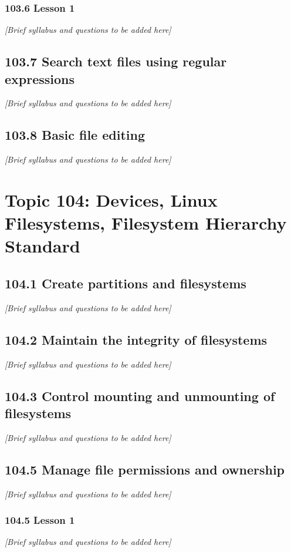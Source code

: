 \documentclass[12pt,a4paper]{report}
\begin{document}
\subsection*{103.6 Lesson 1}
\textit{[Brief syllabus and questions to be added here]}

\section{103.7 Search text files using regular expressions}
\textit{[Brief syllabus and questions to be added here]}

\section{103.8 Basic file editing}
\textit{[Brief syllabus and questions to be added here]}

\chapter{Topic 104: Devices, Linux Filesystems, Filesystem Hierarchy Standard}

\section{104.1 Create partitions and filesystems}
\textit{[Brief syllabus and questions to be added here]}

\section{104.2 Maintain the integrity of filesystems}
\textit{[Brief syllabus and questions to be added here]}

\section{104.3 Control mounting and unmounting of filesystems}
\textit{[Brief syllabus and questions to be added here]}

\section{104.5 Manage file permissions and ownership}
\textit{[Brief syllabus and questions to be added here]}

\subsection*{104.5 Lesson 1}
\textit{[Brief syllabus and questions to be added here]}
\end{document}
